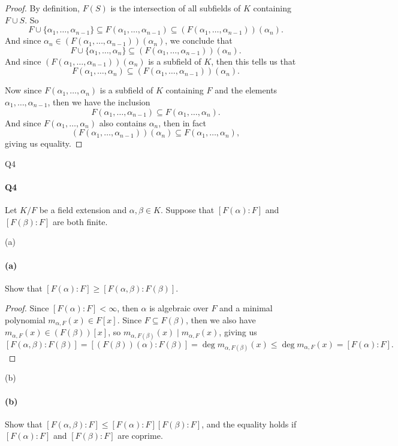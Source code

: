 \documentclass[12pt]{article}
\newenvironment{fullbox}{\begin{lrbox}{\savefullbox}\begin{minipage}{\dimexpr\textwidth-2\fboxsep\relax}}{\end{minipage}\end{lrbox}\begin{center}\framebox[\textwidth]{\usebox{\savefullbox}}\end{center}}
\newenvironment{pbox}[1][]{\begin{fullbox}\ifx#1\empty\else\paragraph{#1}\fi}{\end{fullbox}}
\theoremstyle{definition}
\begin{document}
\begin{proof}
    By definition, $F(S)$ is the intersection of all subfields of $K$ containing $F \cup S$. So
    \[
        F \cup \{\alpha_1, \dots, \alpha_{n-1}\} \subseteq F(\alpha_1, \dots, \alpha_{n-1}) \subseteq (F(\alpha_1, \dots, \alpha_{n-1}))(\alpha_n).
    \]
    And since $\alpha_n \in (F(\alpha_1, \dots, \alpha_{n-1}))(\alpha_n)$, we conclude that
    \[
        F \cup \{\alpha_1, \dots, \alpha_n\} \subseteq (F(\alpha_1, \dots, \alpha_{n-1}))(\alpha_n).
    \]
    And since $(F(\alpha_1, \dots, \alpha_{n-1}))(\alpha_n)$ is a subfield of $K$, then this tells us that
    \[
        F(\alpha_1, \dots, \alpha_n) \subseteq (F(\alpha_1, \dots, \alpha_{n-1}))(\alpha_n).
    \]

    Now since $F(\alpha_1, \dots, \alpha_n)$ is a subfield of $K$ containing $F$ and the elements $\alpha_1, \dots, \alpha_{n-1}$, then we have the inclusion
    \[
        F(\alpha_1, \dots, \alpha_{n-1}) \subseteq F(\alpha_1, \dots, \alpha_n).
    \]
    And since $F(\alpha_1, \dots, \alpha_n)$ also contains $\alpha_n$, then in fact
    \[
        (F(\alpha_1, \dots, \alpha_{n-1}))(\alpha_n) \subseteq F(\alpha_1, \dots, \alpha_n),
    \]
    giving us equality.
    
\end{proof}



\newpage
\begin{pbox}[Q4]
    Let $K/F$ be a field extension and $\alpha, \beta \in K$. Suppose that $[F(\alpha) : F]$ and $[F(\beta) : F]$ are both finite.
\end{pbox}

\begin{pbox}[(a)]
    Show that $[F(\alpha) : F] \geq [F(\alpha, \beta) : F(\beta)]$.
\end{pbox}

\begin{proof}
    Since $[F(\alpha) : F] < \infty$, then $\alpha$ is algebraic over $F$ and a minimal polynomial $m_{\alpha, F}(x) \in F[x]$. Since $F \subseteq F(\beta)$, then we also have $m_{\alpha, F}(x) \in (F(\beta))[x]$, so $m_{\alpha, F(\beta)}(x) \mid m_{\alpha, F}(x)$, giving us
    \[
        [F(\alpha, \beta) : F(\beta)] = [(F(\beta))(\alpha) : F(\beta)] = \deg m_{\alpha, F(\beta)}(x) \leq \deg m_{\alpha, F}(x) = [F(\alpha) : F].
    \]

\end{proof}

\begin{pbox}[(b)]
    Show that $[F(\alpha, \beta) : F] \leq [F(\alpha) : F][F(\beta) : F]$, and the equality holds if $[F(\alpha) : F]$ and $[F(\beta) : F]$ are coprime.
\end{pbox}
\end{document}
